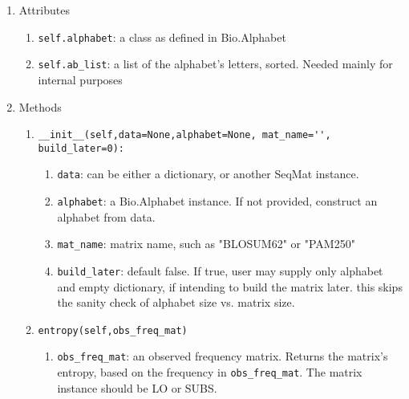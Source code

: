 \begin{enumerate}
  \item Attributes
  \begin{enumerate}
    \item \verb|self.alphabet|: a class as defined in Bio.Alphabet

    \item \verb|self.ab_list|: a list of the alphabet's letters, sorted. Needed mainly for internal purposes
  \end{enumerate}

  \item Methods

  \begin{enumerate}

    \item
\begin{verbatim}
__init__(self,data=None,alphabet=None, mat_name='', build_later=0):
\end{verbatim}

    \begin{enumerate}

      \item \verb|data|: can be either a dictionary, or another SeqMat instance.
      \item \verb|alphabet|: a Bio.Alphabet instance. If not provided, construct an alphabet from data.

      \item \verb|mat_name|: matrix name, such as "BLOSUM62" or "PAM250"

      \item \verb|build_later|: default false. If true, user may supply only alphabet and empty dictionary, if intending to build the matrix later. this skips the sanity check of alphabet size vs. matrix size.

    \end{enumerate}

    \item
\begin{verbatim}
entropy(self,obs_freq_mat)
\end{verbatim}

    \begin{enumerate}
      \item \verb|obs_freq_mat|: an observed frequency matrix. Returns the matrix's entropy, based on the frequency in  \verb|obs_freq_mat|. The matrix instance should be LO or SUBS.
    \end{enumerate}


\end{enumerate}
\end{enumerate}
